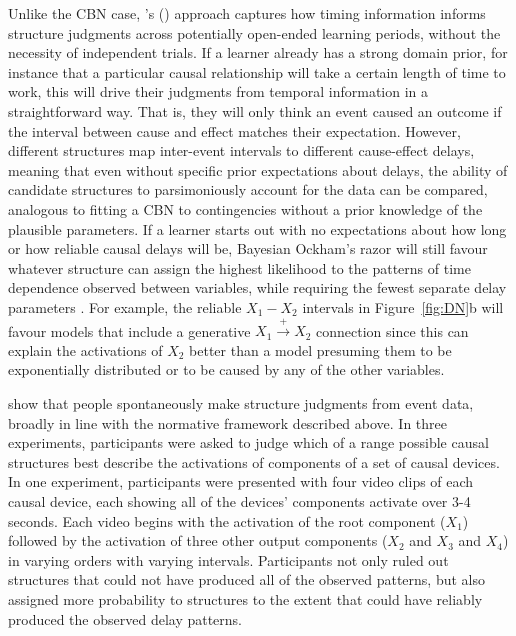 \documentclass{cambridge7A}%
\def\citeapos#1{\citeauthor{#1}'s (\citeyear{#1})}
\begin{document}
Unlike the CBN case, \citeapos{bramley2018time} approach captures how timing information informs structure judgments across potentially open-ended learning periods, without the necessity of independent trials.  If a learner already has a strong domain prior, for instance that a particular causal relationship will take a certain length of time to work, this will drive their judgments from temporal information in a straightforward way.  That is, they will only think an event caused an outcome if the interval between cause and effect matches their expectation.  However, different structures map inter-event intervals to different cause-effect delays, meaning that even without specific prior expectations about delays, the ability of candidate structures to parsimoniously account for the data can be compared, analogous to fitting a CBN to contingencies without a prior knowledge of the plausible parameters.  If a learner starts out with no expectations about how long or how reliable causal delays will be, Bayesian Ockham's razor will still favour whatever structure can assign the highest likelihood to the patterns of time dependence observed between variables, while requiring the fewest separate delay parameters \citep{bramley2018time}.   For example, the reliable $X_1-X_2$ intervals in Figure~\ref{fig:DN}b will favour models that include a generative $X_1\!\stackrel{+}\rightarrow\!X_2$ connection since this can explain the activations of $X_2$ better than a model presuming them to be exponentially distributed or to be caused by any of the other variables.

\cite{bramley2018time} show that people spontaneously make structure judgments from event data, broadly in line with the normative framework described above.  In three experiments, participants were asked to judge which of a range possible causal structures best describe the activations of components of a set of causal devices.    In one experiment, participants were presented with four video clips of each causal device, each showing all of the devices' components activate over 3-4 seconds.  Each video begins with the activation of the root component ($X_1$) followed by the activation of three other output components ($X_2$ and $X_3$ and $X_4$) in varying orders with varying intervals.  Participants not only ruled out structures that could not have produced all of the observed patterns, but also assigned more probability to structures to the extent that could have reliably produced the observed delay patterns.
\end{document}
